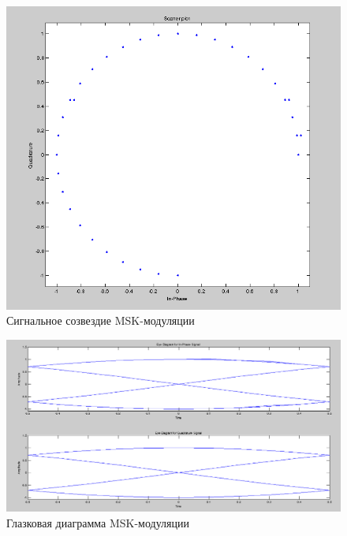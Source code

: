 \begin{figure}[H]
\includegraphics[width=150mm, scale = 0.9]{lab9/9_17}
   \caption{Сигнальное созвездие MSK-модуляции}
\end{figure}



\begin{figure}[H]
\includegraphics[width=150mm, scale = 0.9]{lab9/9_18}
   \caption{Глазковая диаграмма MSK-модуляции}
\end{figure}




